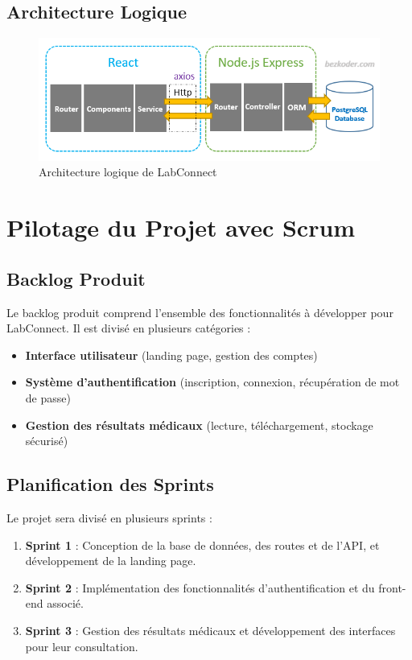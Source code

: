 \documentclass[12pt,a4paper]{report}
\begin{document}
\subsection{Architecture Logique}
\begin{figure}[h]
    \centering
    \includegraphics[width=\textwidth]{./img/ph/ph.png}
    \caption{Architecture logique de LabConnect}
    \label{fig:logical-architecture}
\end{figure}

\section{Pilotage du Projet avec Scrum}

\subsection{Backlog Produit}
Le backlog produit comprend l'ensemble des fonctionnalités à développer pour LabConnect. Il est divisé en plusieurs catégories :

\begin{itemize}
    \item \textbf{Interface utilisateur} (landing page, gestion des comptes)
    \item \textbf{Système d'authentification} (inscription, connexion, récupération de mot de passe)
    \item \textbf{Gestion des résultats médicaux} (lecture, téléchargement, stockage sécurisé)
\end{itemize}

\subsection{Planification des Sprints}
Le projet sera divisé en plusieurs sprints :

\begin{enumerate}
    \item \textbf{Sprint 1} : Conception de la base de données, des routes et de l'API, et développement de la landing page.
    \item \textbf{Sprint 2} : Implémentation des fonctionnalités d'authentification et du front-end associé.
    \item \textbf{Sprint 3} : Gestion des résultats médicaux et développement des interfaces pour leur consultation.
\end{enumerate}
\end{document}
